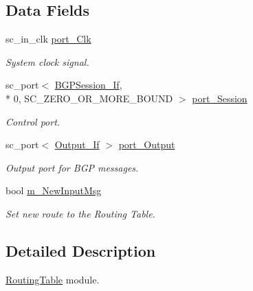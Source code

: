 \subsection*{Data Fields}
\begin{DoxyCompactItemize}
\item 
sc\-\_\-in\-\_\-clk \hyperlink{classRoutingTable_a3f57617a0dbdfabc34534eda6731da74}{port\-\_\-\-Clk}
\begin{DoxyCompactList}\small\item\em System clock signal. \end{DoxyCompactList}\item 
sc\-\_\-port$<$ \hyperlink{classBGPSession__If}{B\-G\-P\-Session\-\_\-\-If}, \\*
0, S\-C\-\_\-\-Z\-E\-R\-O\-\_\-\-O\-R\-\_\-\-M\-O\-R\-E\-\_\-\-B\-O\-U\-N\-D $>$ \hyperlink{classRoutingTable_af24047fc955ca1e81caee0468f70f62c}{port\-\_\-\-Session}
\begin{DoxyCompactList}\small\item\em Control port. \end{DoxyCompactList}\item 
sc\-\_\-port$<$ \hyperlink{classOutput__If}{Output\-\_\-\-If} $>$ \hyperlink{classRoutingTable_ac463a755c9a322a1641ae0422ee845e3}{port\-\_\-\-Output}
\begin{DoxyCompactList}\small\item\em Output port for B\-G\-P messages. \end{DoxyCompactList}\item 
bool \hyperlink{classRoutingTable_a4a4945747e35355545c416e5965b83bc}{m\-\_\-\-New\-Input\-Msg}
\begin{DoxyCompactList}\small\item\em Set new route to the Routing Table. \end{DoxyCompactList}\end{DoxyCompactItemize}


\subsection{Detailed Description}
\hyperlink{classRoutingTable}{Routing\-Table} module. 

